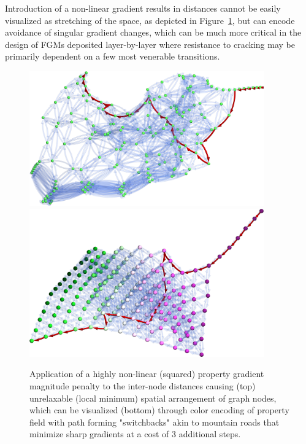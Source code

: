 Introduction of a non-linear gradient results in distances cannot be easily visualized as stretching of the space, as depicted in Figure~\ref{pathplan:fig:lowgradientsquared}, but can encode avoidance of singular gradient changes, which can be much more critical in the design of FGMs deposited layer-by-layer where resistance to cracking may be primarily dependent on a few most venerable transitions.

\begin{figure}[H]
    \centering
    \includegraphics[width=0.9\textwidth]{pathplanning/InfeasibilityGliding_LowGradientSquared.png}
    \includegraphics[width=0.9\textwidth]{pathplanning/InfeasibilityGliding_LowGradientSquaredColored.png}
    \caption{Application of a highly non-linear (squared) property gradient magnitude penalty to the inter-node distances causing (top) unrelaxable (local minimum) spatial arrangement of graph nodes, which can be visualized (bottom) through color encoding of property field with path forming "switchbacks" akin to mountain roads that minimize sharp gradients at a cost of 3 additional steps.}
    \label{pathplan:fig:lowgradientsquared}
\end{figure}


